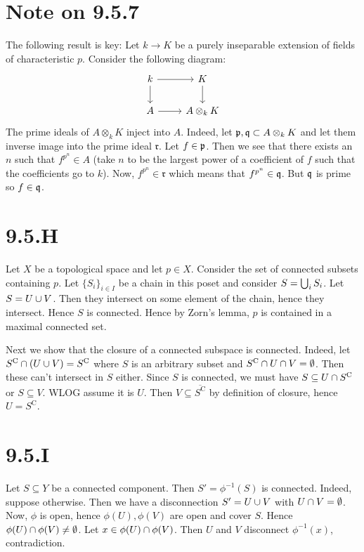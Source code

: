 \documentclass{article}
\begin{document}
\section{Note on 9.5.7}
The following result is key: Let $k \to K$ be a purely inseparable
extension of fields of characteristic $p$. Consider the
following diagram: \[\begin{tikzcd}
        k & K             \\
        A & {A\otimes_kK}
        \arrow[from=1-2, to=2-2] \arrow[from=2-1, to=2-2] \arrow[from=1-1, to=2-1]
        \arrow[from=1-1, to=1-2]
    \end{tikzcd}\] The prime ideals of
$A\otimes_kK$ inject into $A$. Indeed, let
$\mathfrak{p}, \mathfrak{q} \subset A\otimes_kK$ and let them inverse image into the prime ideal
$\mathfrak{r}$. Let $f \in \mathfrak{p}$. Then we see that there
exists an $n$ such that $f^{p^n} \in A$ (take
$n$ to be the largest power of a coefficient of
$f$ such that the coefficients go to
$k$). Now, $f^{p^n} \in \mathfrak{r}$ which means that
$f^{p^n} \in \mathfrak{q}$. But $\mathfrak{q}$ is prime so
$f \in \mathfrak{q}$.

\section{9.5.H}
Let $X$ be a topological space and let
$p \in X$. Consider the set of connected subsets containing
$p$. Let $\{S_i\}_{i \in I}$ be a chain in this poset and
consider $S=\bigcup_i S_i$. Let $S=U \cup V$. Then they
intersect on some element of the chain, hence they intersect. Hence
$S$ is connected. Hence by Zorn's lemma,
$p$ is contained in a maximal connected set.

Next we show that the closure of a connected subspace is connected. Indeed, let
$S^{\text{C}} \cap (U \cup V) =
    S^{\text{C}}$ where $S$ is an arbitrary subset
and $S^{\text{C}} \cap U \cap V = \emptyset$. Then these can't intersect in
$S$ either. Since $S$ is connected, we
must have $S \subseteq U \cap S^{\text{C}}$ or $S \subseteq V$. WLOG assume it is
$U$. Then $V \subseteq \overline{S^{\text{C}}}$ by definition of closure,
hence $U=S^{\text{C}}$.

\section{9.5.I}
Let $S \subseteq Y$ be a connected component. Then
$S'=\phi^{-1}(S)$ is connected. Indeed, suppose otherwise. Then we have a
disconnection $S'=U \cup V$ with $U \cap V = \emptyset$. Now,
$\phi$ is open, hence $\phi(U), \phi(V)$ are open and
cover $S$. Hence $\phi(U) \cap \phi(V) \neq \emptyset$. Let
$x \in \phi(U) \cap \phi(V)$. Then $U$ and
$V$ disconnect $\phi^{-1}(x)$, contradiction.
\end{document}
